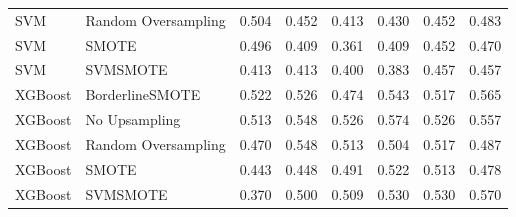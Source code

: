 \begin{tabular}{llllllll}
                         SVM & Random Oversampling & 0.504 &                     0.452 &                 0.413 &                  0.430 &                                   0.452 &    0.483 \\
                         SVM &               SMOTE & 0.496 &                     0.409 &                 0.361 &                  0.409 &                                   0.452 &    0.470 \\
                         SVM &            SVMSMOTE & 0.413 &                     0.413 &                 0.400 &                  0.383 &                                   0.457 &    0.457 \\
                     XGBoost &     BorderlineSMOTE & 0.522 &                     0.526 &                 0.474 &                  0.543 &                                   0.517 &    0.565 \\
                     XGBoost &       No Upsampling & 0.513 &                     0.548 &                 0.526 &                  0.574 &                                   0.526 &    0.557 \\
                     XGBoost & Random Oversampling & 0.470 &                     0.548 &                 0.513 &                  0.504 &                                   0.517 &    0.487 \\
                     XGBoost &               SMOTE & 0.443 &                     0.448 &                 0.491 &                  0.522 &                                   0.513 &    0.478 \\
                     XGBoost &            SVMSMOTE & 0.370 &                     0.500 &                 0.509 &                  0.530 &                                   0.530 &    0.570 \\
\bottomrule
\end{tabular}
